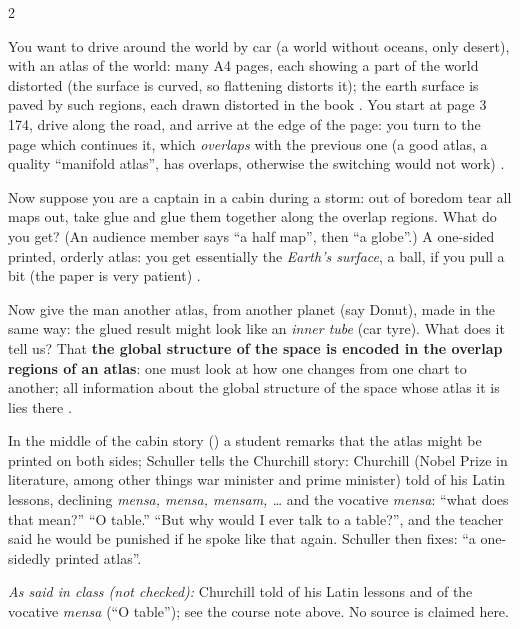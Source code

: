 \begin{paracol}{2}
\begin{intuition}
You want to drive around the world by car (a world without oceans, only desert), with an atlas of the world:
many A4 pages, each showing a part of the world distorted (the surface is curved, so flattening distorts it); the earth
surface is paved by such regions, each drawn distorted in the book .
You start at page 3\,174, drive along the road, and arrive at the edge of the page: you turn to the page which continues
it, which \emph{overlaps} with the previous one (a good atlas, a quality ``manifold atlas'', has overlaps, otherwise
the switching would not work) .\par
Now suppose you are a captain in a cabin during a storm: out of boredom tear all maps out, take glue and glue them
together along the overlap regions. What do you get? (An audience member says ``a half map'', then ``a globe''.)
A one-sided printed, orderly atlas: you get essentially the \emph{Earth's surface}, a ball, if you pull a bit (the
paper is very patient) .\par
Now give the man another atlas, from another planet (say Donut), made in the same way: the glued result might look like
an \emph{inner tube} (car tyre). What does it tell us? That \textbf{the global structure of the space is encoded in the
overlap regions of an atlas}: one must look at how one changes from one chart to another; all information about the
global structure of the space whose atlas it is lies there .
\end{intuition}
\begin{coursenote}
In the middle of the cabin story () a student remarks that the atlas
might be printed on both sides; Schuller tells the Churchill story: Churchill (Nobel Prize in literature, among other
things war minister and prime minister) told of his Latin lessons, declining \emph{mensa, mensa, mensam, \dots} and
the vocative \emph{mensa}: ``what does that mean?'' ``O table.'' ``But why would I ever talk to a table?'', and the
teacher said he would be punished if he spoke like that again. Schuller then fixes: ``a one-sidedly printed atlas''.
\end{coursenote}
\begin{history}
\emph{As said in class (not checked):} Churchill told of his Latin lessons and of the vocative \emph{mensa} (``O table''); see the course note above. No source is claimed here.
\end{history}


\end{paracol}
